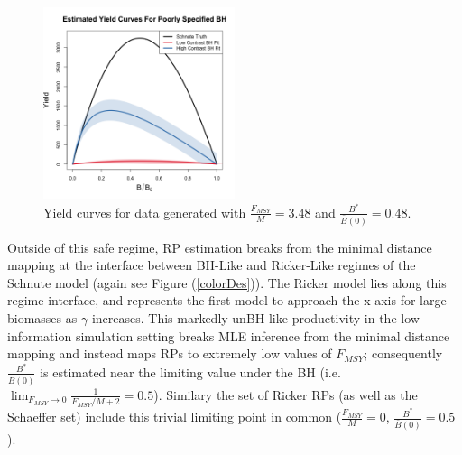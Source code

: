 \documentclass[12pt]{article}
\begin{document}
%
\begin{figure}
\vspace{-0.75cm}
\includegraphics[width=0.5\textwidth]{../gpBias/yeildRelCurveCompareHHardFlatT30N150WWideN112PrettyX3.4791Z0.4662.png}
\vspace{-1cm}
\caption{
Yield curves for data generated with $\frac{F_{MSY}}{M}=3.48$ and $\frac{B^*}{\bar B(0)}=0.48$. 
}
\label{bhFmsy}
\end{figure}

%
Outside of this safe regime, RP estimation breaks from the minimal distance mapping 
at the interface between BH-Like and Ricker-Like regimes of the Schnute model (again see 
Figure (\ref{colorDes})). The Ricker model lies along this regime interface, and  
represents the first model to approach the x-axis for large biomasses as $\gamma$ 
increases. This markedly unBH-like productivity in the low information simulation 
setting breaks MLE inference from the minimal distance mapping and instead maps
RPs to extremely low values of $F_{MSY}$; consequently $\frac{B^*}{\bar B(0)}$ 
is estimated near the limiting value under the BH (i.e. $\lim_{F_{MSY} \to 0}\frac{1}{F_{MSY}/M+2}=0.5$).
Similary the set of Ricker RPs (as well as the Schaeffer set) include this 
trivial limiting point in common ($\frac{F_{MSY}}{M}=0$, $\frac{B^*}{\bar B(0)}=0.5$). 
\end{document}
